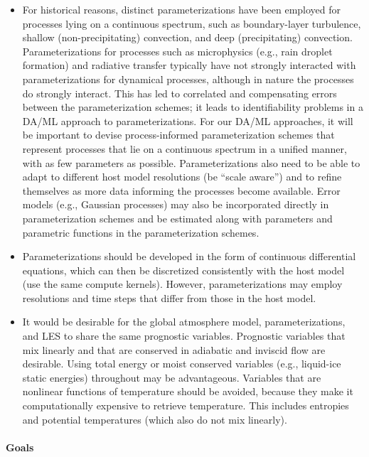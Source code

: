 \documentclass{article}
\begin{document}
\begin{itemize}
    \item For historical reasons, distinct parameterizations have been employed for processes lying on a continuous spectrum, such as boundary-layer turbulence, shallow (non-precipitating) convection, and deep (precipitating) convection. Parameterizations for processes such as microphysics (e.g., rain droplet formation) and radiative transfer typically have not strongly interacted with parameterizations for dynamical processes, although in nature the processes do strongly interact. This has led to correlated and compensating errors between the parameterization schemes; it leads to identifiability problems in a DA/ML approach to parameterizations. For our DA/ML approaches, it will be important to devise process-informed parameterization schemes that represent processes that lie on a continuous spectrum in a unified manner, with as few parameters as possible. Parameterizations also need to be able to adapt to different host model resolutions (be ``scale aware'') and to refine themselves as more data informing the processes become available. Error models (e.g., Gaussian processes) may also be incorporated directly in parameterization schemes and be estimated along with parameters and parametric functions in the parameterization schemes. 
    \item Parameterizations should be developed in the form of continuous differential equations, which can then be discretized consistently with the host model (use the same compute kernels). However, parameterizations may employ resolutions and time steps that differ from those in the host model. 
    \item It would be desirable for the global atmosphere model, parameterizations, and LES to share the same prognostic variables. Prognostic variables that mix linearly and that are conserved in adiabatic and inviscid flow are desirable. Using total energy or moist conserved variables (e.g., liquid-ice static energies) throughout may be advantageous. Variables that are nonlinear functions of temperature should be avoided, because they make it computationally expensive to retrieve temperature. This includes entropies and potential temperatures (which also do not mix linearly). 
\end{itemize}

\paragraph{Goals}
\end{document}
